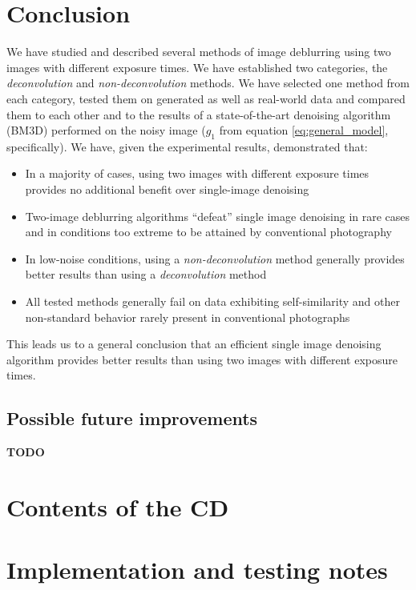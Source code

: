 \documentclass[12pt,notitlepage]{report}
\begin{document}
\chapter{Conclusion}

We have studied and described several methods of image deblurring using two images with different exposure times. We have established two categories, the {\em deconvolution} and {\em non-deconvolution} methods.  We have selected one method from each category, tested them on generated as well as real-world data and compared them to each other and to the results of a state-of-the-art denoising algorithm (BM3D) performed on the noisy image ($g_1$ from equation \ref{eq:general_model}, specifically). We have, given the experimental results, demonstrated that: 

\begin{itemize}
\item In a majority of cases, using two images with different exposure times provides no additional benefit over single-image denoising
\item Two-image deblurring algorithms “defeat” single image denoising in rare cases and in conditions too extreme to be attained by conventional photography
\item In low-noise conditions, using a {\em non-deconvolution} method generally provides better results than using a {\em deconvolution} method
\item All tested methods generally fail on data exhibiting self-similarity and other non-standard behavior rarely present in conventional photographs
\end{itemize}

This leads us to a general conclusion that an efficient single image denoising algorithm provides better results than using two images with different exposure times. 

\section{Possible future improvements}

\textbf{TODO}

\appendix

\chapter{Contents of the CD}


\chapter{Implementation and testing notes}
\label{chap:notes}
\end{document}
